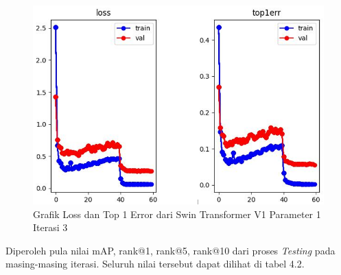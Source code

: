 \begin{figure}[ht]
  \centering
  \includegraphics[scale=0.6]{gambar/Train SwinV1_2.png}
  \caption{Grafik Loss dan Top 1 Error dari Swin Transformer V1 Parameter 1 Iterasi 3}
  \label{fig:grafiklossdantop1errdariswinv1parameter1iterasi3}
\end{figure}

Diperoleh pula nilai mAP, rank@1, rank@5, rank@10 dari proses \emph{Testing} pada 
masing-masing iterasi. Seluruh nilai tersebut dapat dilihat di tabel 4.2.


